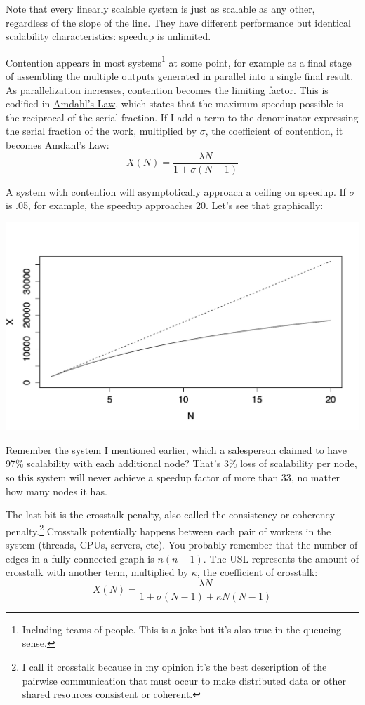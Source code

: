 \documentclass{vivid_layout}
\begin{document}
Note that every linearly scalable system is just as scalable as any other,
regardless of the slope of the line. They have different performance but
identical scalability characteristics: speedup is unlimited. 

Contention appears in most systems\footnote{Including teams of people. This is a
joke but it's also true in the queueing sense.} at
some point, for example as a final stage of assembling the multiple outputs
generated in parallel into a single final result. As parallelization increases,
contention becomes the limiting factor. This is codified in
\href{https://en.wikipedia.org/wiki/Amdahl\%27s\_law}{Amdahl's Law}, which
states that the maximum speedup possible is the reciprocal of the serial
fraction. If I add a term to the denominator expressing the serial fraction of
the work, multiplied by $\sigma$, the coefficient of contention, it becomes
Amdahl's Law:
\begin{equation}
X(N) = \frac{\lambda N}{1 + \sigma(N-1)}
\label{amdahl}
\end{equation}

A system with contention will
asymptotically approach a ceiling on speedup. If $\sigma$ is .05, for example,
the speedup approaches 20. Let's see that graphically:
\begin{center}
\includegraphics[width=.85\linewidth]{scalability/amdahl}
\end{center}

Remember the system I mentioned earlier, which a salesperson claimed to have
97\% scalability with each additional node? That's 3\% loss of scalability per
node, so this system will never achieve a speedup factor of more than 33, no
matter how many nodes it has.

The last bit is the crosstalk penalty, also called the consistency or coherency
penalty.\footnote{I call it crosstalk because in my opinion it's the best
description of the pairwise communication that must occur to make distributed
data or other shared resources consistent or coherent.} Crosstalk potentially
happens between each pair of workers in the system (threads, CPUs, servers,
etc).  You probably remember that the number of edges in a fully connected graph
is $n(n-1)$.  The USL represents the amount of crosstalk with another term, multiplied
by $\kappa$, the coefficient of crosstalk:
\begin{equation}
X(N) = \frac{\lambda N}{1 + \sigma(N-1) + \kappa N(N-1)}
\label{usl}
\end{equation}
\end{document}
